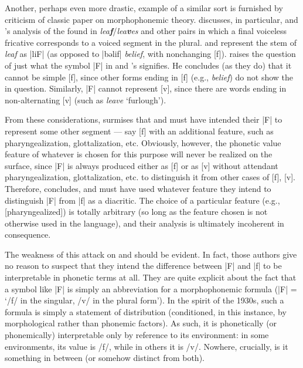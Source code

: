 Another, perhaps even more drastic, example of a similar sort is
furnished by  criticism of
 classic paper on
morphophonemic theory. {\Lightner} discusses, in particular, {\Swadesh} and
{\Voegelin}'s analysis of the  found in 
\emph{lea\textbf{f}}/\emph{lea\textbf{v}es} and other pairs in which a
final voiceless fricative corresponds to a voiced segment in the
plural. {\Swadesh} and {\Voegelin} represent the stem of  \emph{leaf}
as |liF| (as opposed to
|b{ə}lif| \emph{belief}, with nonchanging
[f]). {\Lightner} raises the question of just what the symbol
|F| in {\Swadesh} and {\Voegelin}'s 
signifies. He concludes (as they do) that it cannot be simple [f],
since other forms ending in [f] (e.g., \emph{belief}) do not show the
 in question.  Similarly, |F| cannot
represent [v], since there are words ending in non-alternating [v]
(such as \emph{leave} `furlough').

From these considerations, {\Lightner} surmises that {\Swadesh} and {\Voegelin}
must have intended their |F| to represent some
other segment --- say {[f]} with an additional feature, such as
pharyngealization, glottalization, etc.  Obviously, however, the
phonetic value feature of whatever is chosen for this purpose will
never be realized on the surface, since |F| is
always produced either as {[f]} or as {[v]} without attendant
pharyngealization, glottalization, etc. to distinguish it from other
cases of {[f]}, {[v]}.  Therefore, {\Lightner} concludes, {\Swadesh} and
{\Voegelin} must have used whatever feature they intend to distinguish
|F| from |f| as a diacritic.
The choice of a particular feature (e.g., {[pharyngealized]}) is totally
arbitrary (so long as the feature chosen is not otherwise used in the
language), and their analysis is ultimately incoherent in consequence.

The weakness of this attack on {\Swadesh} and {\Voegelin} should be
evident. In fact, those authors give no reason to suspect that they
intend the difference between |F| and
|f| to be interpretable in phonetic terms at all.
They are quite explicit about the fact that a symbol like
|F| is simply an abbreviation for a morphophonemic
formula (|F| = `/f/ in the singular, /v/ in the
plural form').  In the spirit of the 1930s, such a formula is simply
a statement of distribution (conditioned, in this instance, by
morphological rather than phonemic factors). As such, it is
phonetically (or phonemically) interpretable only by reference to its
environment: in some environments, its value is /f/, while in others
it is /v/.  Nowhere, crucially, is it something in between (or somehow
distinct from both).

